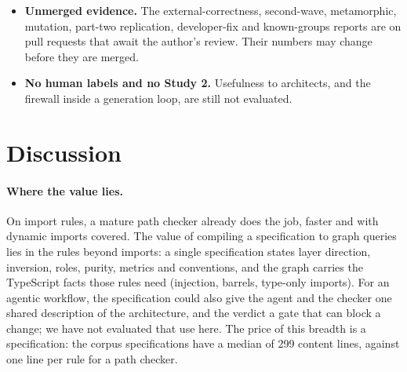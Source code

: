 \documentclass[10pt,a4paper]{article}
\newcommand{\ff}[1]{\texttt{\small #1}}
\begin{document}
\begin{itemize}
        and on Neo4j it hit the transaction timeout on three of them, so those verdicts are computed without it.
        The convergent and mutation runs could not run \ff{FF-P05} on the interpreter; support for its
        \texttt{CALL \{ \ldots{} UNION \ldots{} \}} form was added later and has not been checked live.
  \item \textbf{Unmerged evidence.} The external-correctness, second-wave, metamorphic, mutation, part-two
        replication, developer-fix and known-groups reports are on pull requests that await the author's review.
        Their numbers may change before they are merged.
  \item \textbf{No human labels and no Study 2.} Usefulness to architects, and the firewall inside a generation
        loop, are still not evaluated.
\end{itemize}
\section{Discussion}\label{sec:discussion}

\paragraph{Where the value lies.}
On import rules, a mature path checker already does the job, faster and with dynamic imports covered. The value of
compiling a specification to graph queries lies in the rules beyond imports: a single specification states layer
direction, inversion, roles, purity, metrics and conventions, and the graph carries the TypeScript facts those rules
need (injection, barrels, type-only imports). For an agentic workflow, the specification could also give the agent
and the checker one shared description of the architecture, and the verdict a gate that can block a change; we have
not evaluated that use here. The price of this breadth is a specification: the corpus specifications have a median
of 299 content lines, against one line per rule for a path checker. %
\end{document}
